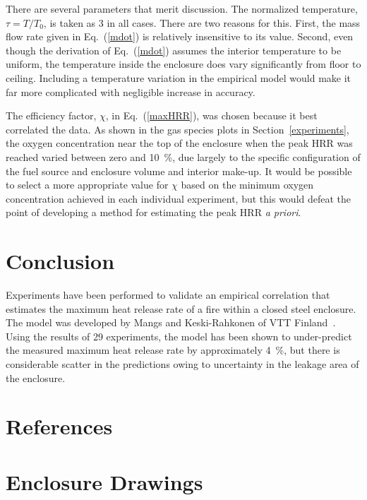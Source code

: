 \documentclass[12pt]{article}
\begin{document}
There are several parameters that merit discussion. The normalized temperature, $\tau=T/T_0$, is taken as 3 in all cases. There are two reasons for this. First, the mass flow rate given in Eq.~(\ref{mdot}) is relatively insensitive to its value. Second, even though the derivation of Eq.~(\ref{mdot}) assumes the interior temperature to be uniform, the temperature inside the enclosure does vary significantly from floor to ceiling. Including a temperature variation in the empirical model would make it far more complicated with negligible increase in accuracy.

The efficiency factor, $\chi$, in Eq.~(\ref{maxHRR}), was chosen because it best correlated the data. As shown in the gas species plots in Section~\ref{experiments}, the oxygen concentration near the top of the enclosure when the peak HRR was reached varied between zero and 10~\%, due largely to the specific configuration of the fuel source and enclosure volume and interior make-up. It would be possible to select a more appropriate value for $\chi$ based on the minimum oxygen concentration achieved in each individual experiment, but this would defeat the point of developing a method for estimating the peak HRR {\em a priori}.


\section{Conclusion}

Experiments have been performed to validate an empirical correlation that estimates the maximum heat release rate of a fire within a closed steel enclosure. The model was developed by Mangs and Keski-Rahkonen of VTT Finland~\cite{Mangs:1994}. Using the results of 29 experiments, the model has been shown to under-predict the measured maximum heat release rate by approximately 4~\%, but there is considerable scatter in the predictions owing to uncertainty in the leakage area of the enclosure.


\clearpage

\section*{References}



\clearpage

\appendix

\section{Enclosure Drawings}
\label{drawings}
\end{document}
